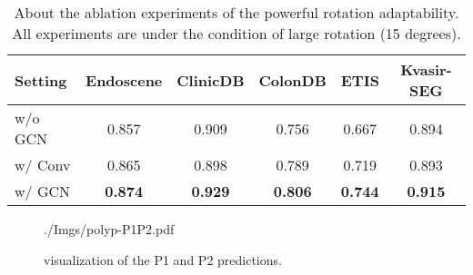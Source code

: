 \documentclass[journal]{IEEEtran}
\begin{document}
\begin{table}
  \centering
  
  \caption{About the ablation experiments of the powerful rotation adaptability. All experiments are under the condition of large rotation (15 degrees).}
  \renewcommand{\arraystretch}{1.1}
  \setlength\tabcolsep{1.9pt}
    \begin{tabular}{l|c|c|c|c|c}
    \hline
     Setting & Endoscene & ClinicDB & ColonDB & ETIS  & Kvasir-SEG \\
    \hline
w/o GCN & 0.857  & 0.909  & 0.756  & 0.667  & {0.894}  \\
           w/ Conv & 0.865  & 0.898  & 0.789  & 0.719  & {0.893}  \\
           w/ GCN & \textbf{0.874} & \textbf{0.929} & \textbf{0.806} & \textbf{0.744} & \textbf{0.915} \\
          \hline
    \end{tabular}\label{tab:gcn rotation}\vspace{10pt}
\end{table}

\begin{figure}[t!]
 	\centering
 	\begin{overpic}[width=\linewidth]{./Imgs/polyp-P1P2.pdf}
    \end{overpic}
    \vspace{-15pt}
 	\caption{visualization of the P1 and P2 predictions.}
     \label{figure:P1P2}
     \vspace{10pt}
\end{figure}
\end{document}
